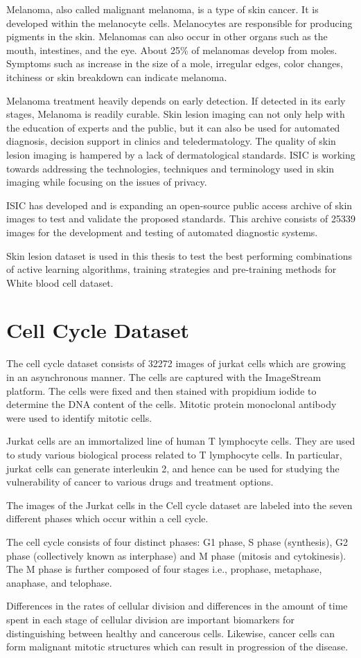 Melanoma, also called malignant melanoma, is a type of skin cancer. It is developed within the melanocyte cells. Melanocytes are responsible for producing pigments in the skin. Melanomas can also occur in other organs such as the mouth, intestines, and the eye. About 25\% of melanomas develop from moles. Symptoms such as increase in the size of a mole, irregular edges, color changes, itchiness or skin breakdown can indicate melanoma.

Melanoma treatment heavily depends on early detection. If detected in its early stages, Melanoma is readily curable. Skin lesion imaging can not only help with the education of experts and the public, but it can also be used for automated diagnosis, decision support in clinics and teledermatology. The quality of skin lesion imaging is hampered by a lack of dermatological standards. ISIC is working towards addressing the technologies, techniques and terminology used in skin imaging while focusing on the issues of privacy.

ISIC has developed and is expanding an open-source public access archive of skin images to test and validate the proposed standards. This archive consists of 25339 images for the development and testing of automated diagnostic systems.

Skin lesion dataset is used in this thesis to test the best performing combinations of active learning algorithms, training strategies and pre-training methods for White blood cell dataset.

\section{Cell Cycle Dataset}

The cell cycle dataset consists of 32272 images of jurkat cells which are growing in an asynchronous manner. The cells are captured with the ImageStream platform. The cells were fixed and then stained with propidium iodide to determine the DNA content of the cells. Mitotic protein monoclonal antibody were used to identify mitotic cells.

Jurkat cells are an immortalized line of human T lymphocyte cells. They are used to study various biological process related to T lymphocyte cells. In particular, jurkat cells can generate interleukin 2, and hence can be used for studying the vulnerability of cancer to various drugs and treatment options.

The images of the Jurkat cells in the Cell cycle dataset are labeled into the seven different phases which occur within a cell cycle.

The cell cycle consists of four distinct phases: G1 phase, S phase (synthesis), G2 phase (collectively known as interphase) and M phase (mitosis and cytokinesis). The M phase is further composed of four stages i.e., prophase, metaphase, anaphase, and telophase.

Differences in the rates of cellular division and differences in the amount of time spent in each stage of cellular division are important biomarkers for distinguishing between healthy and cancerous cells. Likewise, cancer cells can form malignant mitotic structures which can result in progression of the disease. 